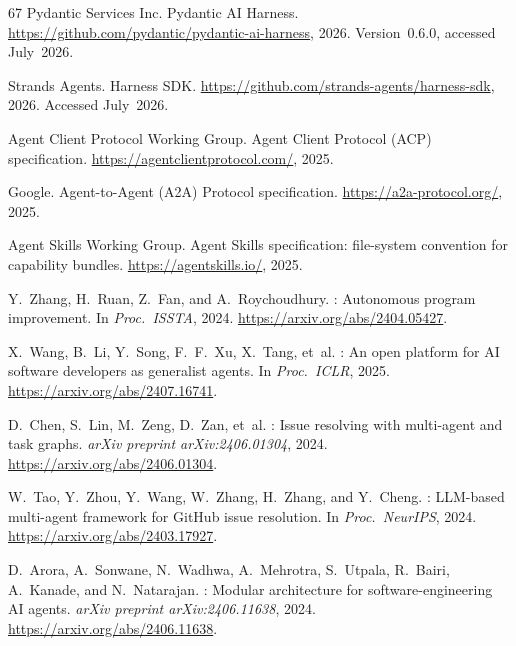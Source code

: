 \documentclass[11pt,a4paper]{article}
\begin{document}
\begin{thebibliography}{67}
{Pydantic Services Inc.}
\newblock Pydantic {AI} Harness.
\newblock \url{https://github.com/pydantic/pydantic-ai-harness}, 2026.
\newblock Version~0.6.0, accessed July~2026.

{Strands Agents}.
\newblock Harness {SDK}.
\newblock \url{https://github.com/strands-agents/harness-sdk}, 2026.
\newblock Accessed July~2026.

{Agent Client Protocol Working Group}.
\newblock Agent Client Protocol (ACP) specification.
\newblock \url{https://agentclientprotocol.com/}, 2025.

{Google}.
\newblock Agent-to-Agent (A2A) Protocol specification.
\newblock \url{https://a2a-protocol.org/}, 2025.

{Agent Skills Working Group}.
\newblock Agent Skills specification: file-system convention for capability bundles.
\newblock \url{https://agentskills.io/}, 2025.


Y.~Zhang, H.~Ruan, Z.~Fan, and A.~Roychoudhury.
: Autonomous program improvement.
\newblock In \emph{Proc.\ ISSTA}, 2024.
\newblock \url{https://arxiv.org/abs/2404.05427}.

X.~Wang, B.~Li, Y.~Song, F.~F.~Xu, X.~Tang, et~al.
: An open platform for {AI} software developers as generalist agents.
\newblock In \emph{Proc.\ ICLR}, 2025.
\newblock \url{https://arxiv.org/abs/2407.16741}.

D.~Chen, S.~Lin, M.~Zeng, D.~Zan, et~al.
: Issue resolving with multi-agent and task graphs.
\newblock \emph{arXiv preprint arXiv:2406.01304}, 2024.
\newblock \url{https://arxiv.org/abs/2406.01304}.

W.~Tao, Y.~Zhou, Y.~Wang, W.~Zhang, H.~Zhang, and Y.~Cheng.
: {LLM}-based multi-agent framework for {GitHub} issue resolution.
\newblock In \emph{Proc.\ NeurIPS}, 2024.
\newblock \url{https://arxiv.org/abs/2403.17927}.

D.~Arora, A.~Sonwane, N.~Wadhwa, A.~Mehrotra, S.~Utpala, R.~Bairi, A.~Kanade, and N.~Natarajan.
: Modular architecture for software-engineering {AI} agents.
\newblock \emph{arXiv preprint arXiv:2406.11638}, 2024.
\newblock \url{https://arxiv.org/abs/2406.11638}.


\end{thebibliography}
\end{document}
